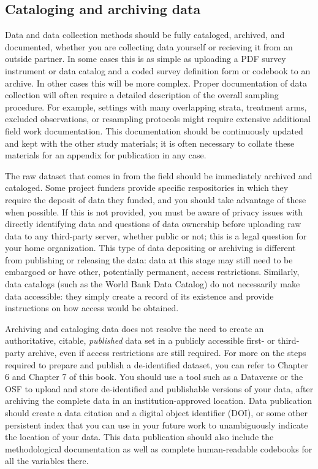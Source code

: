 \subsection{Cataloging and archiving data}

Data and data collection methods should be fully cataloged, archived, and documented,
whether you are collecting data yourself or recieving it from an outside partner.
In some cases this is as simple as uploading a PDF survey instrument or data catalog
and a coded survey definition form or codebook to an archive.
In other cases this will be more complex.
Proper documentation of data collection will often require
a detailed description of the overall sampling procedure.
For example, settings with many overlapping strata,
treatment arms, excluded observations, or resampling protocols
might require extensive additional field work documentation.
This documentation should be continuously updated
and kept with the other study materials;
it is often necessary to collate these materials
for an appendix for publication in any case.

The raw dataset that comes in from the field should be immediately archived and cataloged.
Some project funders
provide specific respositories in which they require the deposit of data they funded,
and you should take advantage of these when possible.
If this is not provided, you must be aware of privacy issues
with directly identifying data and questions of data ownership
before uploading raw data to any third-party server, whether public or not;
this is a legal question for your home organization.
This type of data depositing or archiving
is different from publishing or releasing the data:
data at this stage may still need to be embargoed
or have other, potentially permanent, access restrictions.
Similarly, data catalogs (such as the World Bank Data Catalog)
do not necessarily make data accessible: they simply create a record of its existence
and provide instructions on how access would be obtained.

Archiving and cataloging data does not resolve
the need to create an authoritative, citable, \textit{published} data set
in a publicly accessible first- or third-party archive,
even if access restrictions are still required.
For more on the steps required to prepare and publish a de-identified dataset,
you can refer to Chapter 6 and Chapter 7 of this book.
You should use a tool such as a Dataverse or the OSF
to upload and store de-identified and publishable versions of your data,
after archiving the complete data in an institution-approved location.
Data publication should create a data citation and a digital object identifier (DOI),
or some other persistent index that you can use in your future work
to unambiguously indicate the location of your data.
This data publication should also include the methodological documentation
as well as complete human-readable codebooks for all the variables there.

